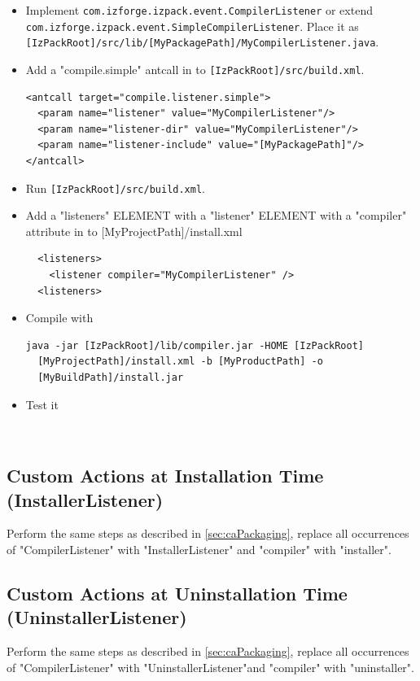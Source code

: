 \begin{itemize}
  \item Implement \texttt{com.izforge.izpack.event.CompilerListener} or
  extend \texttt{com.izforge.izpack.event.SimpleCompilerListener}.
  Place it as \texttt{[IzPackRoot]/src/lib/[MyPackagePath]/MyCompilerListener.java}.

  \item Add a "compile.simple" antcall in to \texttt{[IzPackRoot]/src/build.xml}.
\footnotesize
\begin{verbatim}
<antcall target="compile.listener.simple">
  <param name="listener" value="MyCompilerListener"/>
  <param name="listener-dir" value="MyCompilerListener"/>
  <param name="listener-include" value="[MyPackagePath]"/>
</antcall>
\end{verbatim}
\normalsize

  \item Run \texttt{[IzPackRoot]/src/build.xml}.

  \item Add a "listeners" ELEMENT with a "listener" ELEMENT with
  a "compiler" attribute in to [MyProjectPath]/install.xml
\footnotesize
\begin{verbatim}
  <listeners>
    <listener compiler="MyCompilerListener" />
  <listeners>
\end{verbatim}
\normalsize

  \item Compile with
\footnotesize
\begin{verbatim}
java -jar [IzPackRoot]/lib/compiler.jar -HOME [IzPackRoot]
  [MyProjectPath]/install.xml -b [MyProductPath] -o
  [MyBuildPath]/install.jar
\end{verbatim}
\normalsize

  \item Test it
\end{itemize}\

\subsection{Custom Actions at Installation Time (InstallerListener)}
Perform the same steps as described in \ref{sec:caPackaging}, replace
all occurrences of "CompilerListener" with "InstallerListener" and
"compiler" with "installer".

\subsection{Custom Actions at Uninstallation Time
(UninstallerListener)} Perform the same steps as described in
\ref{sec:caPackaging}, replace all occurrences of
"CompilerListener" with "UninstallerListener"and "compiler" with
"uninstaller".



